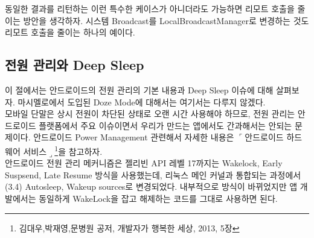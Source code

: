 동일한 결과를 리턴하는 이런 특수한 케이스가 아니더라도 가능하면 리모트 호출을 줄이는 방안을 생각하자. 
시스템 Broadcast를 LocalBroadcastManager로 변경하는 것도 리모트 호출을 줄이는 하나의 예이다. 

\subsection{전원 관리와 Deep Sleep}
이 절에서는 안드로이드의 전원 관리의 기본 내용과 Deep Sleep 이슈에 대해 살펴보자. 마시멜로에서 도입된 Doze Mode에 대해서는 여기서는 다루지 않겠다.\\

모바일 단말은 상시 전원이 차단된 상태로 오랜 시간 사용해야 하므로, 전원 관리는 안드로이드 플랫폼에서 주요 이슈이면서 우리가 만드는 앱에서도 간과해서는 안되는 문제이다.
안드로이드 Power Management 관련해서 자세한 내용은 $\ulcorner$안드로이드 하드웨어 서비스$\lrcorner$\footnote{김대우,박재영,문병원 공저, 개발자가 행복한 세상, 2013, 5장}을 참고하자.\\

안드로이드 전원 관리 메커니즘은 젤리빈 API 레벨 17까지는 Wakelock, Early Suspsend, Late Resume 방식을 사용했는데, 리눅스 메인 커널과 통합되는 과정에서(3.4) Autosleep, Wakeup sources로 변경되었다. 내부적으로 방식이 바뀌었지만 앱 개발에서는 동일하게 WakeLock을 잡고 해제하는 코드를 그대로 사용하면 된다.\\

